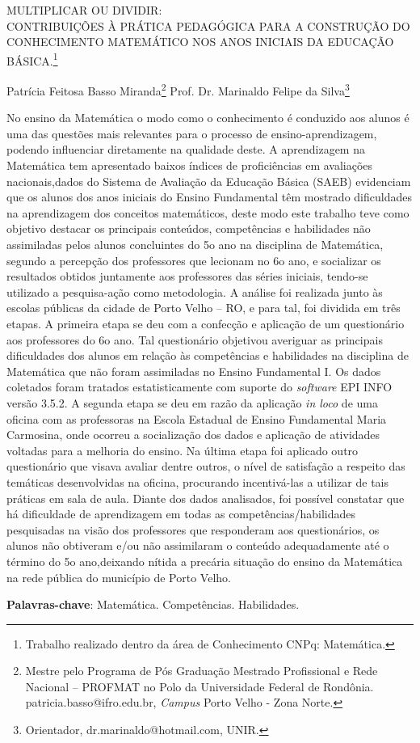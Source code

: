 \documentclass[article,12pt,onesidea,4paper,english,brazil]{abntex2}
\begin{document}
	
	
	\frenchspacing 
	
	\begin{center}
		\LARGE MULTIPLICAR OU DIVIDIR: \\CONTRIBUIÇÕES À PRÁTICA PEDAGÓGICA PARA A CONSTRUÇÃO DO CONHECIMENTO MATEMÁTICO NOS ANOS INICIAIS DA EDUCAÇÃO BÁSICA.\footnote{Trabalho realizado dentro da área de Conhecimento CNPq: Matemática.}
		
		\normalsize
		Patrícia Feitosa Basso Miranda\footnote{Mestre pelo Programa de Pós Graduação Mestrado Profissional e Rede Nacional – PROFMAT no Polo da Universidade Federal de Rondônia. patricia.basso@ifro.edu.br, \textit{Campus} Porto Velho - Zona Norte.} 
		Prof. Dr. Marinaldo Felipe da Silva\footnote{Orientador, dr.marinaldo@hotmail.com, UNIR.} 
	\end{center}
	
	\noindent No ensino da Matemática o modo como o conhecimento é conduzido aos alunos é
	uma das questões mais relevantes para o processo de ensino-aprendizagem,
	podendo influenciar diretamente na qualidade deste. A aprendizagem na Matemática
	tem apresentado baixos índices de proficiências em avaliações nacionais,dados do
	Sistema de Avaliação da Educação Básica (SAEB) evidenciam que os alunos dos
	anos iniciais do Ensino Fundamental têm mostrado dificuldades na aprendizagem
	dos conceitos matemáticos, deste modo este trabalho teve como objetivo destacar
	os principais conteúdos, competências e habilidades não assimiladas pelos alunos
	concluintes do 5o ano na disciplina de Matemática, segundo a percepção dos
	professores que lecionam no 6o ano, e socializar os resultados obtidos juntamente
	aos professores das séries iniciais, tendo-se utilizado a pesquisa-ação como
	metodologia. A análise foi realizada junto às escolas públicas da cidade de Porto
	Velho – RO, e para tal, foi dividida em três etapas. A primeira etapa se deu com a
	confecção e aplicação de um questionário aos professores do 6o ano. Tal
	questionário objetivou averiguar as principais dificuldades dos alunos em relação às
	competências e habilidades na disciplina de Matemática que não foram assimiladas
	no Ensino Fundamental I. Os dados coletados foram tratados estatisticamente com
	suporte do \textit{software} EPI INFO versão 3.5.2. A segunda etapa se deu em razão da
	aplicação \textit{in loco} de uma oficina com as professoras na Escola Estadual de Ensino
	Fundamental Maria Carmosina, onde ocorreu a socialização dos dados e aplicação
	de atividades voltadas para a melhoria do ensino. Na última etapa foi aplicado outro
	questionário que visava avaliar dentre outros, o nível de satisfação a respeito das
	temáticas desenvolvidas na oficina, procurando incentivá-las a utilizar de tais
	práticas em sala de aula. Diante dos dados analisados, foi possível constatar que há
	dificuldade de aprendizagem em todas as competências/habilidades pesquisadas na
	visão dos professores que responderam aos questionários, os alunos não obtiveram
	e/ou não assimilaram o conteúdo adequadamente até o término do 5o ano,deixando
	nítida a precária situação do ensino da Matemática na rede pública do município de
	Porto Velho.
	
	\vspace{\onelineskip}
	
	\noindent
	\textbf{Palavras-chave}: Matemática. Competências. Habilidades.
	
\end{document}
